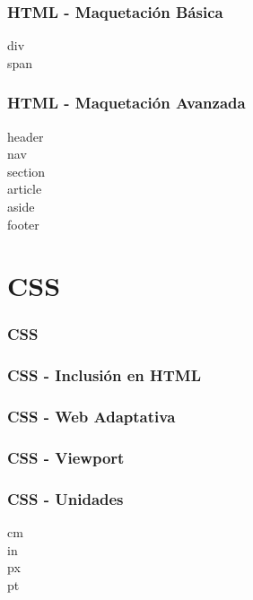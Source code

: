 \documentclass[a4paper,slidestop,xcolor=pst,blue]{beamer}
\begin{document}
\begin{frame}[c]
    \frametitle{HTML - Maquetación Básica}
    \begin{description}
        \item[div]
        \item[span]
    \end{description}
\end{frame}

\begin{frame}[c]
    \frametitle{HTML - Maquetación Avanzada}
    \begin{description}
        \item[header]
        \item[nav]
        \item[section]
        \item[article]
        \item[aside]
        \item[footer]
    \end{description}
\end{frame}

\section{CSS}

\begin{frame}[c]
    \frametitle{CSS}
\end{frame}

\begin{frame}[c]
    \frametitle{CSS - Inclusión en HTML}
\end{frame}

\begin{frame}[c]
    \frametitle{CSS - Web Adaptativa}
\end{frame}

\begin{frame}[c]
    \frametitle{CSS - Viewport}
\end{frame}

\begin{frame}[c]
    \frametitle{CSS - Unidades}
    \begin{description}
        \item[cm]
        \item[in]
        \item[px]
        \item[pt]
    \end{description}
\end{frame}
\end{document}
